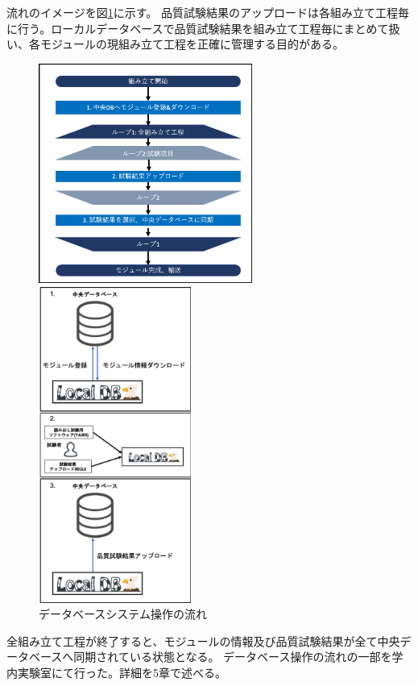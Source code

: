 流れのイメージを図\ref{dbsystem_flow}に示す。
品質試験結果のアップロードは各組み立て工程毎に行う。ローカルデータベースで品質試験結果を組み立て工程毎にまとめて扱い、各モジュールの現組み立て工程を正確に管理する目的がある。
\begin{figure}[bpt]\centering
  \begin{minipage}{0.5\hsize}
    \includegraphics[width=7cm]{dbsystem_flowchart}
  \end{minipage}
  \begin{minipage}{0.4\hsize}
    \includegraphics[width=5cm]{dbsystem_flow_image}
  \end{minipage}
\caption[データベースシステム操作の流れ]{データベースシステム操作の流れ}
\label{dbsystem_flow}
\end{figure}

全組み立て工程が終了すると、モジュールの情報及び品質試験結果が全て中央データベースへ同期されている状態となる。
データベース操作の流れの一部を学内実験室にて行った。詳細を5章で述べる。

